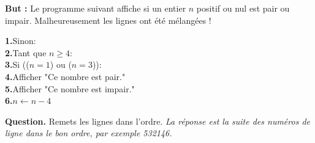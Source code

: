 \documentclass[class=report,crop=false, 12pt]{standalone}
\begin{document}
\begin{enigme}[Boucles II]

 
\textbf{But :} Le programme suivant affiche si un entier $n$ positif ou nul est pair ou impair. Malheureusement les lignes ont été mélangées !

  
\begin{center}
\begin{minipage}{0.8\textwidth}
\textbf{1.}\indentation Sinon:\\
\textbf{2.}\indentation Tant que $n\ge4$:\\
\textbf{3.}\indentation Si (($n=1$) ou  ($n=3$)):\\
\textbf{4.}\indentation\indentation Afficher "Ce nombre est pair."\\
\textbf{5.}\indentation\indentation Afficher "Ce nombre est impair."\\
\textbf{6.}\indentation\indentation $n \leftarrow n - 4$\\
\end{minipage}
\end{center}   
 
\bigskip

\textbf{Question.} Remets les lignes dans l'ordre. \emph{La réponse est la suite des numéros de ligne dans le bon ordre, par exemple 532146.}

%

\end{enigme}
\end{document}
